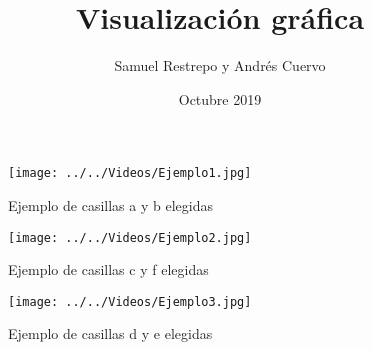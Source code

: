 \documentclass{beamer}
\title{Visualización gráfica}
\author{Samuel Restrepo y Andrés Cuervo}
\date{Octubre 2019}
\begin{document}
\begin{frame}
\titlepage
\end{frame}

\begin{frame}
\begin{figure}[hbtp]
\centering
\texttt{[image: ../../Videos/Ejemplo1.jpg]}
\caption{Ejemplo de casillas a y b elegidas}
\end{figure}

\end{frame}

\begin{frame}
\begin{figure}[hbtp]
\centering
\texttt{[image: ../../Videos/Ejemplo2.jpg]}
\caption{Ejemplo de casillas c y f elegidas}
\end{figure}

\end{frame}

\begin{frame}
\begin{figure}[hbtp]
\centering
\texttt{[image: ../../Videos/Ejemplo3.jpg]} 
\caption{Ejemplo de casillas d y e elegidas}
\end{figure}
\end{frame}
\end{document}
